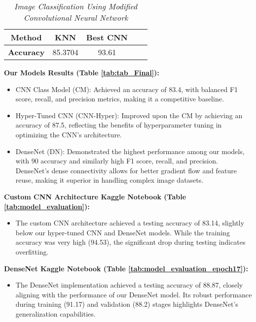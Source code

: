\begin{table}[H]
    \centering
    \caption{\textit{Image Classification Using Modified Convolutional Neural Network} \cite{khan2024image}} 
    \begin{tabular}{||c|c|c|c|c||} 
     \hline    
     \textbf{Method} & \textbf{KNN} & \textbf{Best CNN}  \\
     \hline \hline
     \textbf{Accuracy} & 85.3704 & 93.61 \\
     \hline
    \end{tabular}
    \label{tab:classification_comparison}
\end{table}



\textbf{Our Models Results (Table \ref{tab:tab_Final}):}
\begin{itemize}
    \item CNN Class Model (CM): Achieved an accuracy of 83.4, with balanced F1 score, recall, and precision metrics, making it a competitive baseline.
    \item Hyper-Tuned CNN (CNN-Hyper): Improved upon the CM by achieving an accuracy of 87.5, reflecting the benefits of hyperparameter tuning in optimizing the CNN's architecture.
    \item DenseNet (DN): Demonstrated the highest performance among our models, with 90 accuracy and similarly high F1 score, recall, and precision. DenseNet's dense connectivity allows for better gradient flow and feature reuse, making it superior in handling complex image datasets.
\end{itemize}

\textbf{Custom CNN Architecture Kaggle Notebook (Table \ref{tab:model_evaluation}):}
\begin{itemize}
    \item The custom CNN architecture achieved a testing accuracy of 83.14, slightly below our hyper-tuned CNN and DenseNet models. While the training accuracy was very high (94.53), the significant drop during testing indicates overfitting.
\end{itemize}

\textbf{DenseNet Kaggle Notebook (Table \ref{tab:model_evaluation_epoch17}):}
\begin{itemize}
    \item The DenseNet implementation achieved a testing accuracy of 88.87, closely aligning with the performance of our DenseNet model. Its robust performance during training (91.17) and validation (88.2) stages highlights DenseNet's generalization capabilities.
\end{itemize}
    

